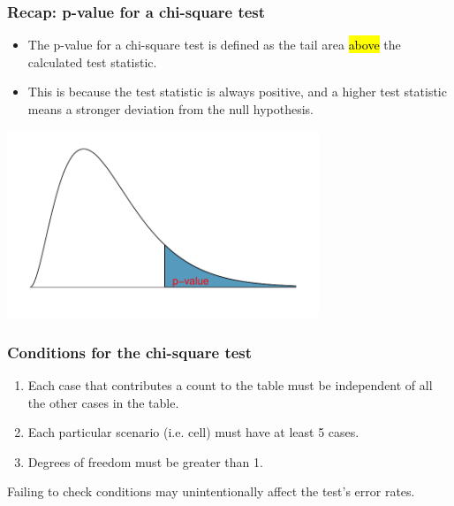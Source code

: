 \documentclass[notes,11pt, aspectratio=169]{beamer}
\begin{document}
\begin{frame}
\frametitle{Recap: p-value for a chi-square test}

\begin{itemize}

\item The p-value for a chi-square test is defined as the tail area \hl{above} the calculated test statistic.

\item This is because the test statistic is always positive, and a higher test statistic means a stronger deviation from the null hypothesis.

\end{itemize}

\begin{center}
\includegraphics[width=0.7\textwidth]{graphs/genericChiSquare}
\end{center}

\end{frame}


\begin{frame}
\frametitle{Conditions for the chi-square test}

\begin{enumerate}

\item {} Each case that contributes a count to the table must be independent of all the other cases in the table.

\pause

\item {} Each particular scenario (i.e. cell) must have at least 5  cases.

\pause

\item {} Degrees of freedom must be greater than 1.

\end{enumerate}

\pause

Failing to check conditions may unintentionally affect the test's error rates.

\end{frame}
\end{document}
